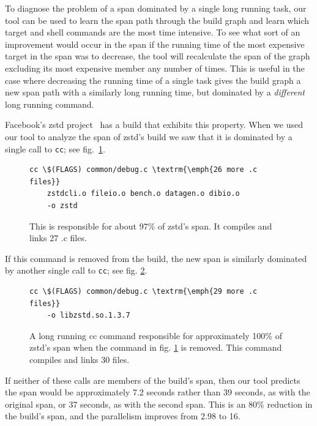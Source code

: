 \documentclass[sigconf,10pt,authorversion]{acmart}\settopmatter{printfolios=true,printccs=false,printacmref=false}
\begin{document}
To diagnose the problem of a span dominated by a single long running
task, our tool can be used to learn the span path through the build
graph and learn which target and shell commands are the most time
intensive.  To see what sort of an improvement would occur in the span
if the running time of the most expensive target in the span was to
decrease, the tool will recalculate the span of the graph excluding
its most expensive member any number of times.  This is useful in the
case where decreasing the running time of a single task gives the
build graph a new span path with a similarly long running time, but
 dominated by a \emph{different} long running command.

Facebook's zstd project~\cite{zstd1.3.7} has a build that exhibits
this property.  When we used our tool to analyze the span of zstd's
build we saw that it is dominated by a single call to \verb|cc|; see
fig.~\ref{code:cc1}.

\begin{figure}[H]
\begin{Verbatim}[commandchars=\\\{\},codes={\catcode`$=3\catcode`^=7\catcode`_=8},fontsize=\small]
  cc \$(FLAGS) common/debug.c \textrm{\emph{26 more .c files}}
    zstdcli.o fileio.o bench.o datagen.o dibio.o
    -o zstd
\end{Verbatim}
\caption{This is responsible for about 97\% of zstd's span.  It compiles and links 27 .c files.}
\label{code:cc1}
\end{figure}

If this command is removed from the build, the new span is similarly dominated by another single call to \verb|cc|; see fig. \ref{code:cc2}.
\begin{figure}[H]
\begin{Verbatim}[commandchars=\\\{\},codes={\catcode`$=3\catcode`^=7\catcode`_=8},fontsize=\small]
  cc \$(FLAGS) common/debug.c \textrm{\emph{29 more .c files}}
    -o libzstd.so.1.3.7
\end{Verbatim}
\caption{A long running cc command responsible for approximately 100\%
  of zstd's span when the command in fig. \ref{code:cc1} is removed.
  This command compiles and links 30 files.}
\label{code:cc2}
\end{figure}
If neither of these calls are members of the build's span, then our
tool predicts the span would be approximately 7.2 seconds rather than
39 seconds, as with the original span, or 37 seconds, as with the
second span.  This is an 80\% reduction in the build's span, and
the parallelism improves from 2.98 to 16.
\end{document}
